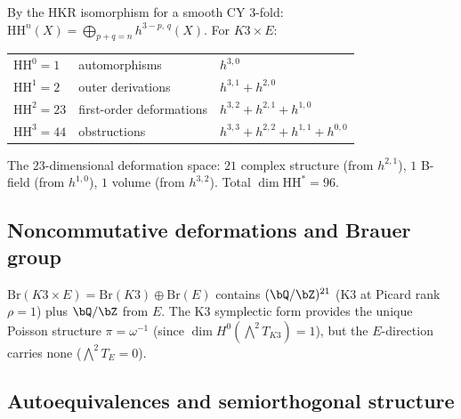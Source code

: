 \begin{proposition}
\label{prop:hkr-k3xe}
By the HKR isomorphism for a smooth CY $3$-fold:
$\mathrm{HH}^n(X) = \bigoplus_{p+q=n} h^{3-p,\,q}(X)$.
For $K3 \times E$:
\begin{center}
\small
\renewcommand{\arraystretch}{1.2}
\begin{tabular}{lll}
$\mathrm{HH}^0 = 1$ & automorphisms & $h^{3,0}$ \\
$\mathrm{HH}^1 = 2$ & outer derivations & $h^{3,1} + h^{2,0}$ \\
$\mathrm{HH}^2 = 23$ & first-order deformations & $h^{3,2} + h^{2,1} + h^{1,0}$ \\
$\mathrm{HH}^3 = 44$ & obstructions & $h^{3,3} + h^{2,2} + h^{1,1} + h^{0,0}$
\end{tabular}
\end{center}
The $23$-dimensional deformation space: $21$ complex structure
\textup{(}from $h^{2,1}$\textup{)}, $1$ B-field \textup{(}from
$h^{1,0}$\textup{)}, $1$ volume \textup{(}from
$h^{3,2}$\textup{)}. Total
$\dim \mathrm{HH}^* = 96$.
\end{proposition}

\subsection{Noncommutative deformations and Brauer group}
\label{subsec:nc-brauer}

\begin{remark}
\label{rem:brauer-k3xe}
$\mathrm{Br}(K3 \times E) = \mathrm{Br}(K3) \oplus \mathrm{Br}(E)$
contains $(\bQ/\bZ)^{21}$ (K3 at Picard rank $\rho = 1$) plus
$\bQ/\bZ$ from $E$. The K3 symplectic form provides the unique
Poisson structure $\pi = \omega^{-1}$ (since $\dim H^0(\bigwedge^2
T_{K3}) = 1$), but the $E$-direction carries none
($\bigwedge^2 T_E = 0$).
\end{remark}

\subsection{Autoequivalences and semiorthogonal structure}
\label{subsec:sod-k3xe}

